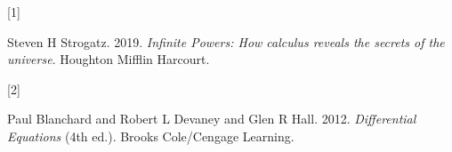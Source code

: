 \documentclass[
  a4paper,
]{article}
\newlength{\cslhangindent}
\newlength{\csllabelwidth}
\newenvironment{CSLReferences}[2] %
 {\begin{list}{}{%
  \setlength{\itemindent}{0pt}
  \setlength{\leftmargin}{0pt}
  \setlength{\parsep}{0pt}
  \ifodd #1
   \setlength{\leftmargin}{\cslhangindent}
   \setlength{\itemindent}{-1\cslhangindent}
  \fi
  \setlength{\itemsep}{#2\baselineskip}}}
 {\end{list}}
\newcommand{\CSLLeftMargin}[1]{\parbox[t]{\csllabelwidth}{\strut#1\strut}}
\newcommand{\CSLRightInline}[1]{\parbox[t]{\linewidth - \csllabelwidth}{\strut#1\strut}}
\begin{document}
\label{refs}
\begin{CSLReferences}{0}{0}
\CSLLeftMargin{{[}1{]} }%
\CSLRightInline{Steven H Strogatz. 2019. \emph{{Infinite Powers}: {How
calculus reveals the secrets of the universe}}. Houghton Mifflin
Harcourt.}

\CSLLeftMargin{{[}2{]} }%
\CSLRightInline{Paul Blanchard and Robert L Devaney and Glen R Hall.
2012. \emph{{Differential Equations}} (4th ed.). Brooks Cole/Cengage
Learning.}

\end{CSLReferences}
\end{document}
